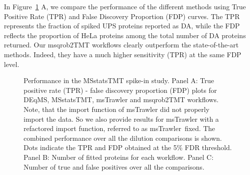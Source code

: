 \documentclass[
  letterpaper,
  DIV=11,
  numbers=noendperiod]{scrartcl}
\begin{document}
In Figure~\ref{fig-WorkflowComparisons} A, we compare the performance of
the different methods using True Positive Rate (TPR) and False Discovery
Proportion (FDP) curves. The TPR represents the fraction of spiked UPS
proteins reported as DA, while the FDP reflects the proportion of HeLa
proteins among the total number of DA proteins returned. Our msqrob2TMT
workflows clearly outperform the state-of-the-art methods. Indeed, they
have a much higher sensitivity (TPR) at the same FDP level.

\begin{figure}[H]


\caption{\label{fig-WorkflowComparisons}Performance in the MSstatsTMT
spike-in study. Panel A: True positive rate (TPR) - false discovery
proportion (FDP) plots for DEqMS, MSstatsTMT, msTrawler and msqrob2TMT
workflows. Note, that the import function of msTrawler did not properly
import the data. So we also provide results for msTrawler with a
refactored import function, referred to as msTrawler~fixed. The combined
performance over all the dilution comparisons is shown. Dots indicate
the TPR and FDP obtained at the 5\% FDR threshold. Panel B: Number of
fitted proteins for each workflow. Panel C: Number of true and false
positives over all the comparisons.}

\end{figure}%
\end{document}
